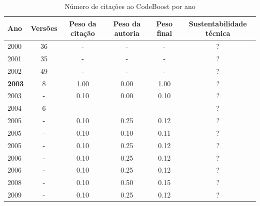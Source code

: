 \begin{table}[H]
\caption{Número de citações ao CodeBoost por ano}
\centering
\begin{tabular}{| l | c | c | c | c | c |}
  \hline
  Ano & Versões & Peso da citação & Peso da autoria & Peso final & Sustentabilidade técnica \\
  \hline
        2000 & 36 & - & - & - & ? \\
\hline
        2001 & 35 & - & - & - & ? \\
\hline
        2002 & 49 & - & - & - & ? \\
\hline
            {\bf 2003}
          &
          8
          &
          1.00
          &
          0.00
          &
            {\color{blue} 1.00}
          &
          ?
          \\
            2003
          &
          -
          &
          0.10
          &
          0.00
          &
            {\color{red} 0.10}
          &
          ?
          \\
\hline
        2004 & 6 & - & - & - & ? \\
\hline
            2005
          &
          -
          &
          0.10
          &
          0.25
          &
            {\color{red} 0.12}
          &
          ?
          \\
            2005
          &
          -
          &
          0.10
          &
          0.10
          &
            {\color{red} 0.11}
          &
          ?
          \\
            2005
          &
          -
          &
          0.10
          &
          0.25
          &
            {\color{red} 0.12}
          &
          ?
          \\
\hline
            2006
          &
          -
          &
          0.10
          &
          0.25
          &
            {\color{red} 0.12}
          &
          ?
          \\
            2006
          &
          -
          &
          0.10
          &
          0.25
          &
            {\color{red} 0.12}
          &
          ?
          \\
\hline
            2008
          &
          -
          &
          0.10
          &
          0.50
          &
            {\color{red} 0.15}
          &
          ?
          \\
\hline
            2009
          &
          -
          &
          0.10
          &
          0.25
          &
            {\color{red} 0.12}
          &
          ?

\end{tabular}
\end{table}
